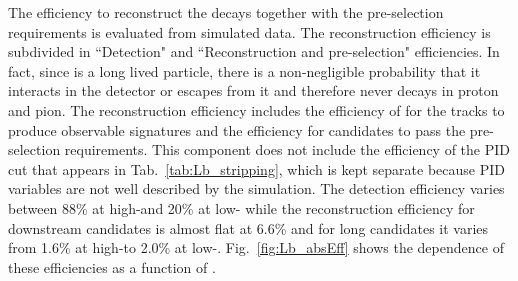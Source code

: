 The efficiency to reconstruct the decays together with the pre-selection requirements is
evaluated from simulated data. 
The reconstruction efficiency is subdivided in ``Detection" and ``Reconstruction and pre-selection" efficiencies.
In fact, since \Lz is a long lived particle, there is a non-negligible probability that it interacts in the detector
or escapes from it and therefore never decays in proton and pion. 
The reconstruction efficiency includes the efficiency of
for the tracks to produce observable signatures and the efficiency for candidates to pass the pre-selection 
requirements. This component does not include the efficiency
of the PID cut that appears in Tab.~\ref{tab:Lb_stripping}, which is kept separate
because PID variables are not well described by the simulation.
The detection efficiency varies between 88\% at high-\qsq and 20\% at low-\qsq
while the reconstruction efficiency for downstream candidates is almost flat at 6.6\%
and for long candidates it varies from 1.6\% at high-\qsq to 2.0\% at low-\qsq.
Fig.~\ref{fig:Lb_absEff} shows the dependence of these efficiencies as a function of \qsq.
%
%
